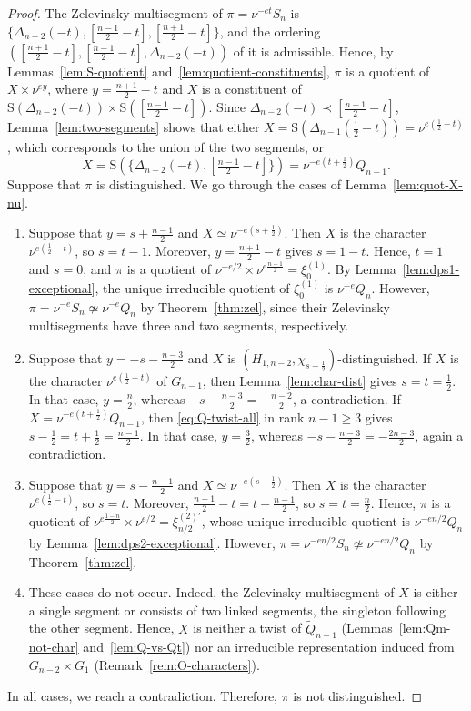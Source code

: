 \documentclass[11pt]{amsart}
\numberwithin{equation}{section}
\theoremstyle{plain}
\theoremstyle{definition}
\theoremstyle{remark}
\newcommand{\Qt}{\widetilde{Q}}
\newcommand{\xione}{\xi^{(1)}}
\newcommand{\Ss}{\mathrm{S}}
\begin{document}
\begin{proof}
	The Zelevinsky multisegment of $\pi=\nu^{-et}S_n$ is $\{\Delta_{n-2}(-t),[\frac{n-1}2-t],[\frac{n+1}2-t]\}$, and the ordering $([\frac{n+1}2-t],[\frac{n-1}2-t],\Delta_{n-2}(-t))$ of it is admissible. Hence, by Lemmas~\ref{lem:S-quotient} and~\ref{lem:quotient-constituents}, $\pi$ is a quotient of $X\times\nu^{ey}$, where $y=\frac{n+1}2-t$ and $X$ is a constituent of $\Ss(\Delta_{n-2}(-t))\times\Ss([\frac{n-1}2-t])$. Since $\Delta_{n-2}(-t)\prec[\frac{n-1}2-t]$, Lemma~\ref{lem:two-segments} shows that either $X=\Ss(\Delta_{n-1}(\frac12-t))=\nu^{e(\frac12-t)}$, which corresponds to the union of the two segments, or
	$$X=\Ss(\{\Delta_{n-2}(-t),[\tfrac{n-1}2-t]\})=\nu^{-e(t+\frac12)}Q_{n-1}.$$
	Suppose that $\pi$ is distinguished. We go through the cases of Lemma~\ref{lem:quot-X-nu}.
	\begin{enumerate}[label=(\alph*)]
		\item Suppose that $y=s+\frac{n-1}2$ and $X\simeq\nu^{-e(s+\frac12)}$. Then $X$ is the character $\nu^{e(\frac12-t)}$, so $s=t-1$. Moreover, $y=\frac{n+1}2-t$ gives $s=1-t$. Hence, $t=1$ and $s=0$, and $\pi$ is a quotient of $\nu^{-e/2}\times\nu^{e\frac{n-1}2}=\xione_0$. By Lemma~\ref{lem:dps1-exceptional}, the unique irreducible quotient of $\xione_0$ is $\nu^{-e}Q_n$. However, $\pi=\nu^{-e}S_n\not\simeq\nu^{-e}Q_n$ by Theorem~\ref{thm:zel}, since their Zelevinsky multisegments have three and two segments, respectively.
		\item Suppose that $y=-s-\frac{n-3}2$ and $X$ is $(H_{1,n-2},\chi_{s-\frac12})$-distinguished. If $X$ is the character $\nu^{e(\frac12-t)}$ of $G_{n-1}$, then Lemma~\ref{lem:char-dist} gives $s=t=\frac12$. In that case, $y=\frac n2$, whereas $-s-\frac{n-3}2=-\frac{n-2}2$, a contradiction. If $X=\nu^{-e(t+\frac12)}Q_{n-1}$, then \eqref{eq:Q-twist-all} in rank $n-1\ge3$ gives $s-\frac12=t+\frac12=\frac{n-1}2$. In that case, $y=\frac32$, whereas $-s-\frac{n-3}2=-\frac{2n-3}2$, again a contradiction.
		\item Suppose that $y=s-\frac{n-1}2$ and $X\simeq\nu^{-e(s-\frac12)}$. Then $X$ is the character $\nu^{e(\frac12-t)}$, so $s=t$. Moreover, $\frac{n+1}2-t=t-\frac{n-1}2$, so $s=t=\frac n2$. Hence, $\pi$ is a quotient of $\nu^{e\frac{1-n}2}\times\nu^{e/2}=\xi^{(2)\prime}_{n/2}$, whose unique irreducible quotient is $\nu^{-en/2}Q_n$ by Lemma~\ref{lem:dps2-exceptional}. However, $\pi=\nu^{-en/2}S_n\not\simeq\nu^{-en/2}Q_n$ by Theorem~\ref{thm:zel}.
		\item[\textup{(d), (e)}] These cases do not occur. Indeed, the Zelevinsky multisegment of $X$ is either a single segment or consists of two linked segments, the singleton following the other segment. Hence, $X$ is neither a twist of $\Qt_{n-1}$ (Lemmas~\ref{lem:Qm-not-char} and~\ref{lem:Q-vs-Qt}) nor an irreducible representation induced from $G_{n-2}\times G_1$ (Remark~\ref{rem:O-characters}).
	\end{enumerate}
	In all cases, we reach a contradiction. Therefore, $\pi$ is not distinguished.
\end{proof}
\end{document}
